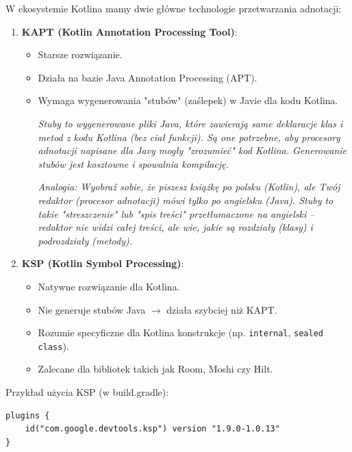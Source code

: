W ekosystemie Kotlina mamy dwie główne technologie przetwarzania adnotacji:

\begin{enumerate}
    \item \textbf{KAPT (Kotlin Annotation Processing Tool)}:
    \begin{itemize}
        \item Starsze rozwiązanie.
        \item Działa na bazie Java Annotation Processing (APT).
        \item Wymaga wygenerowania "stubów" (zaślepek) w Javie dla kodu Kotlina.
        
        \textit{Stuby to wygenerowane pliki Java, które zawierają same deklaracje klas i metod z kodu Kotlina (bez ciał funkcji). Są one potrzebne, aby procesory adnotacji napisane dla Javy mogły "zrozumieć" kod Kotlina. Generowanie stubów jest kosztowne i spowalnia kompilację.}
        
        \textit{Analogia: Wyobraź sobie, że piszesz książkę po polsku (Kotlin), ale Twój redaktor (procesor adnotacji) mówi tylko po angielsku (Java). Stuby to takie "streszczenie" lub "spis treści" przetłumaczone na angielski – redaktor nie widzi całej treści, ale wie, jakie są rozdziały (klasy) i podrozdziały (metody).}

    \end{itemize}

    \item \textbf{KSP (Kotlin Symbol Processing)}:
    \begin{itemize}
        \item Natywne rozwiązanie dla Kotlina.
        \item Nie generuje stubów Java $\rightarrow$ działa szybciej niż KAPT.
        \item Rozumie specyficzne dla Kotlina konstrukcje (np. \texttt{internal}, \texttt{sealed class}).
        \item Zalecane dla bibliotek takich jak Room, Moshi czy Hilt.
    \end{itemize}
\end{enumerate}

Przykład użycia KSP (w build.gradle):
\begin{verbatim}
plugins {
    id("com.google.devtools.ksp") version "1.9.0-1.0.13"
}
\end{verbatim}
